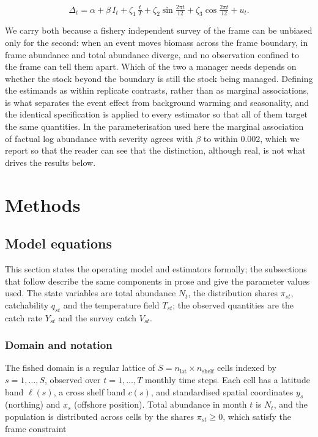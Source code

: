 \documentclass[
  11pt,
  a4paper,
]{article}
\begin{document}
\begin{equation}
\Delta_t = \alpha + \beta\,I_t + \zeta_1\,\tfrac{t}{T} + \zeta_2 \sin\!\tfrac{2\pi t}{12} + \zeta_3 \cos\!\tfrac{2\pi t}{12} + u_t.
\end{equation}

\noindent We carry both because a fishery independent survey of the frame can be
unbiased only for the second: when an event moves biomass across the
frame boundary, in frame abundance and total abundance diverge, and no
observation confined to the frame can tell them apart. Which of the two
a manager needs depends on whether the stock beyond the boundary is
still the stock being managed. Defining the estimands as within
replicate contrasts, rather than as marginal associations, is what
separates the event effect from background warming and seasonality, and
the identical specification is applied to every estimator so that all of
them target the same quantities. In the parameterisation used here the
marginal association of factual log abundance with severity agrees with
\(\beta\) to within 0.002, which we report so that the reader can see
that the distinction, although real, is not what drives the results
below.

\hypertarget{methods}{%
\section{Methods}\label{methods}}

\hypertarget{model-equations}{%
\subsection{Model equations}\label{model-equations}}

This section states the operating model and estimators formally; the
subsections that follow describe the same components in prose and give
the parameter values used. The state variables are total abundance
\(N_t\), the distribution shares \(\pi_{st}\), catchability \(q_{st}\)
and the temperature field \(T_{st}\); the observed quantities are the
catch rate \(Y_{st}\) and the survey catch \(V_{st}\).

\hypertarget{domain-and-notation}{%
\subsubsection{Domain and notation}\label{domain-and-notation}}

The fished domain is a regular lattice of
\(S = n_{\text{lat}} \times n_{\text{shelf}}\) cells indexed by
\(s = 1, \dots, S\), observed over \(t = 1, \dots, T\) monthly time
steps. Each cell has a latitude band \(\ell(s)\), a cross shelf band
\(c(s)\), and standardised spatial coordinates \(y_s\) (northing) and
\(x_s\) (offshore position). Total abundance in month \(t\) is \(N_t\),
and the population is distributed across cells by the shares
\(\pi_{st} \ge 0\), which satisfy the frame constraint
\end{document}
